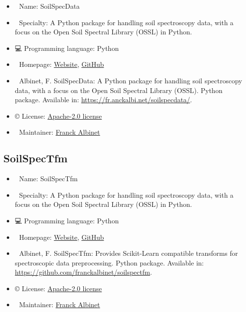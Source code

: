 \documentclass[
  letterpaper,
  DIV=11,
  numbers=noendperiod]{scrreprt}
\providecommand{\tightlist}{%
  \setlength{\itemsep}{0pt}\setlength{\parskip}{0pt}}\usepackage{longtable,booktabs,array}
\begin{document}
\begin{itemize}
\tightlist
\item
  📛 Name: SoilSpecData\\
\item
  💼 Specialty: A Python package for handling soil spectroscopy data,
  with a focus on the Open Soil Spectral Library (OSSL) in Python.\\
\item
  💻 Programming language: Python\\
\item
  🔗 Homepage: \href{https://fr.anckalbi.net/soilspecdata/}{Website},
  \href{https://github.com/franckalbinet/soilspecdata}{GitHub}\\
\item
  📕 Albinet, F. SoilSpecData: A Python package for handling soil
  spectroscopy data, with a focus on the Open Soil Spectral Library
  (OSSL). Python package. Available in:
  \url{https://fr.anckalbi.net/soilspecdata/}.\\
\item
  ©️ License:
  \href{https://github.com/franckalbinet/soilspecdata?tab=Apache-2.0-1-ov-file\#readme}{Apache-2.0
  license}
\item
  📧 Maintainer: \href{https://github.com/franckalbinet}{Franck Albinet}
\end{itemize}

\subsection{SoilSpecTfm}\label{soilspectfm}

\begin{itemize}
\tightlist
\item
  📛 Name: SoilSpecTfm\\
\item
  💼 Specialty: A Python package for handling soil spectroscopy data,
  with a focus on the Open Soil Spectral Library (OSSL) in Python.\\
\item
  💻 Programming language: Python\\
\item
  🔗 Homepage: \href{https://fr.anckalbi.net/soilspectfm/}{Website},
  \href{https://github.com/franckalbinet/soilspecdata}{GitHub}\\
\item
  📕 Albinet, F. SoilSpecTfm: Provides Scikit-Learn compatible
  transforms for spectroscopic data preprocessing. Python package.
  Available in: \url{https://github.com/franckalbinet/soilspectfm}.\\
\item
  ©️ License:
  \href{https://github.com/franckalbinet/soilspectfm\#Apache-2.0-1-ov-file}{Apache-2.0
  license}
\item
  📧 Maintainer: \href{https://github.com/franckalbinet}{Franck Albinet}
\end{itemize}
\end{document}
